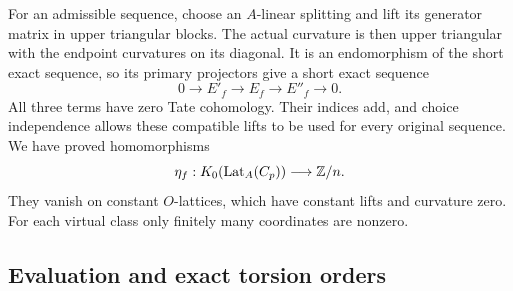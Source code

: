 For an admissible sequence, choose an $A$-linear splitting and
lift its generator matrix in upper triangular blocks.  The actual
curvature is then upper triangular with the endpoint curvatures
on its diagonal.  It is an endomorphism of the short exact sequence,
so its primary projectors give a short exact sequence
\[
 0\longrightarrow E'_f\longrightarrow E_f
       \longrightarrow E''_f\longrightarrow0.
\]
All three terms have zero Tate cohomology.  Their indices add,
and choice independence allows these compatible lifts to be used
for every original sequence.  We have proved homomorphisms
\begin{equation}\label{eq:all-truncation-index}
 \eta_f:K_0(\operatorname{Lat}_A(C_p))\longrightarrow\mathbb Z/n.
\end{equation}
They vanish on constant $O$-lattices, which have constant lifts
and curvature zero.  For each virtual class only finitely many
coordinates are nonzero.

\subsection{Evaluation and exact torsion orders}

